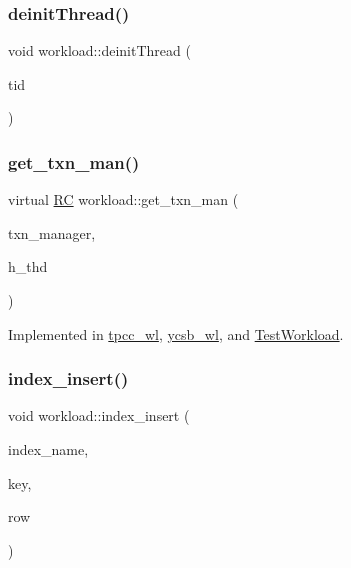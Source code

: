 \subsubsection{\texorpdfstring{deinit\+Thread()}{deinitThread()}}
{\footnotesize\ttfamily void workload\+::deinit\+Thread (\begin{DoxyParamCaption}\item[{const int}]{tid }\end{DoxyParamCaption})}

\mbox{\label{classworkload_ac22d0558c3fc549b8b07347cebb95cb3}} 
\subsubsection{\texorpdfstring{get\+\_\+txn\+\_\+man()}{get\_txn\_man()}}
{\footnotesize\ttfamily virtual \hyperlink{global_8h_a78c49a674c810fdd03d20432f7be864a}{RC} workload\+::get\+\_\+txn\+\_\+man (\begin{DoxyParamCaption}\item[{\hyperlink{classtxn__man}{txn\+\_\+man} $\ast$\&}]{txn\+\_\+manager,  }\item[{\hyperlink{classthread__t}{thread\+\_\+t} $\ast$}]{h\+\_\+thd }\end{DoxyParamCaption})\hspace{0.3cm}{\ttfamily [pure virtual]}}



Implemented in \hyperlink{classtpcc__wl_a7794924fd334984a429b43e151ad040a}{tpcc\+\_\+wl}, \hyperlink{classycsb__wl_a31fb01819cd6a3517259ec9bb80066ca}{ycsb\+\_\+wl}, and \hyperlink{classTestWorkload_abc14a45ce19f90979f01cf2e96f1bb9f}{Test\+Workload}.

\mbox{\label{classworkload_ae88a8556d1384e6ba6bd5aa01dddaf60}} 
\subsubsection{\texorpdfstring{index\+\_\+insert()}{index\_insert()}\hspace{0.1cm}{\footnotesize\ttfamily [1/2]}}
{\footnotesize\ttfamily void workload\+::index\+\_\+insert (\begin{DoxyParamCaption}\item[{std\+::string}]{index\+\_\+name,  }\item[{uint64\+\_\+t}]{key,  }\item[{\hyperlink{classrow__t}{row\+\_\+t} $\ast$}]{row }\end{DoxyParamCaption})\hspace{0.3cm}{\ttfamily [protected]}}

